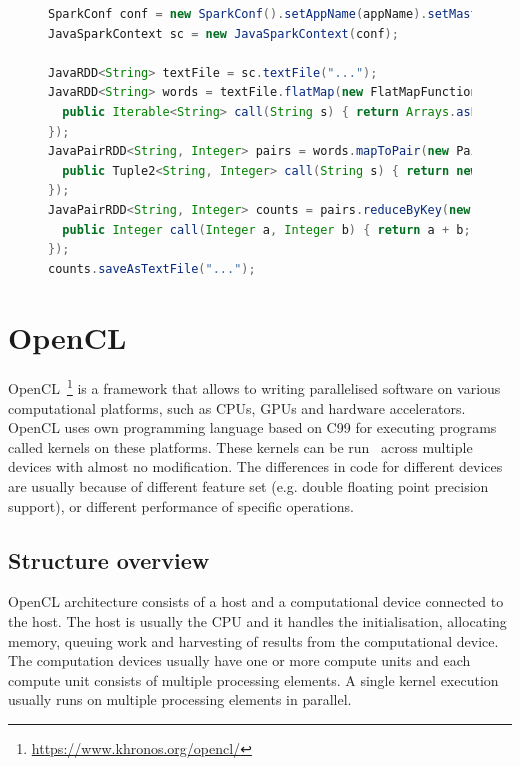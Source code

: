 \documentclass{l4proj}
\begin{document}
\begin{figure}
  \begin{lstlisting}[language=Java]
SparkConf conf = new SparkConf().setAppName(appName).setMaster(master);
JavaSparkContext sc = new JavaSparkContext(conf);

JavaRDD<String> textFile = sc.textFile("...");
JavaRDD<String> words = textFile.flatMap(new FlatMapFunction<String, String>() {
  public Iterable<String> call(String s) { return Arrays.asList(s.split(" ")); }
});
JavaPairRDD<String, Integer> pairs = words.mapToPair(new PairFunction<String, String, Integer>() {
  public Tuple2<String, Integer> call(String s) { return new Tuple2<String, Integer>(s, 1); }
});
JavaPairRDD<String, Integer> counts = pairs.reduceByKey(new Function2<Integer, Integer, Integer>() {
  public Integer call(Integer a, Integer b) { return a + b; }
});
counts.saveAsTextFile("...");
  \end{lstlisting}
\end{figure}

\section{OpenCL}

OpenCL~\footnote{\url{https://www.khronos.org/opencl/}} is a framework that allows to writing parallelised software on various computational
platforms, such as CPUs, GPUs and hardware accelerators. OpenCL uses own programming language
based on C99 for executing programs called kernels on these platforms. These kernels can be run \
across multiple devices with almost no modification. The differences in code for different devices are 
usually because of different feature set (e.g. double floating point precision support), or
different performance of specific operations.

\subsection{Structure overview}

OpenCL architecture consists 
of a host and a computational device connected to the host.
The host is usually the CPU and it handles the initialisation, allocating memory, queuing work
and harvesting of results from the computational device. The computation devices usually have one
or more compute units and each compute unit consists of multiple processing elements. A single kernel
execution usually runs on multiple processing elements in parallel.
\end{document}
